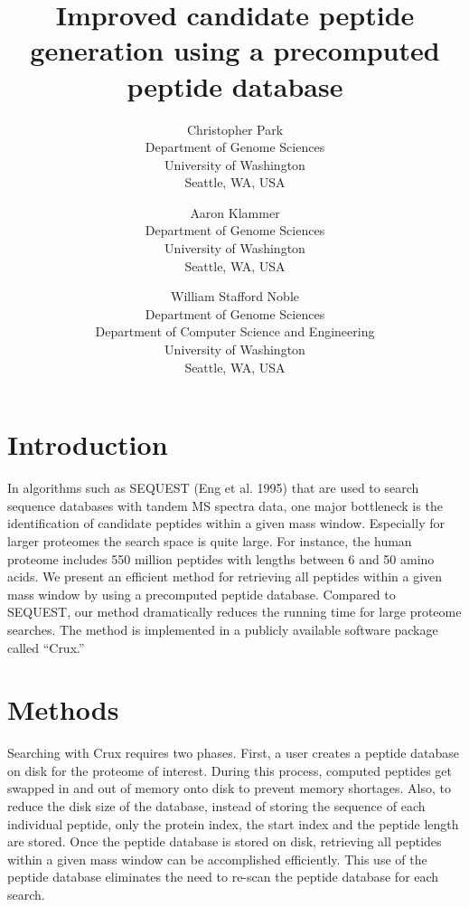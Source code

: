 \documentclass[12pt]{article}
\begin{document}
\title{Improved candidate peptide generation using a precomputed
peptide database}

\author{
Christopher Park\\
Department of Genome Sciences\\
University of Washington\\
Seattle, WA, USA
\and
Aaron Klammer\\
Department of Genome Sciences\\
University of Washington\\
Seattle, WA, USA
\and
William Stafford Noble\\
Department of Genome Sciences\\
Department of Computer Science and Engineering\\
University of Washington\\
Seattle, WA, USA
}

\maketitle

\section{Introduction}

In algorithms such as SEQUEST (Eng et al. 1995) that are used to
search sequence databases with tandem MS spectra data, one major
bottleneck is the identification of candidate peptides within a given
mass window. Especially for larger proteomes the search space is quite
large. For instance, the human proteome includes 550 million peptides
with lengths between 6 and 50 amino acids. We present an efficient
method for retrieving all peptides within a given mass window by using
a precomputed peptide database.  Compared to SEQUEST, our method
dramatically reduces the running time for large proteome searches.
The method is implemented in a publicly available software package
called ``Crux.''

\section{Methods}

Searching with Crux requires two phases.  First, a user creates a
peptide database on disk for the proteome of interest. During this
process, computed peptides get swapped in and out of memory onto disk
to prevent memory shortages. Also, to reduce the disk size of the
database, instead of storing the sequence of each individual peptide,
only the protein index, the start index and the peptide length are
stored.  Once the peptide database is stored on disk, retrieving all
peptides within a given mass window can be accomplished efficiently.
This use of the peptide database eliminates the need to re-scan the
peptide database for each search.
\end{document}

